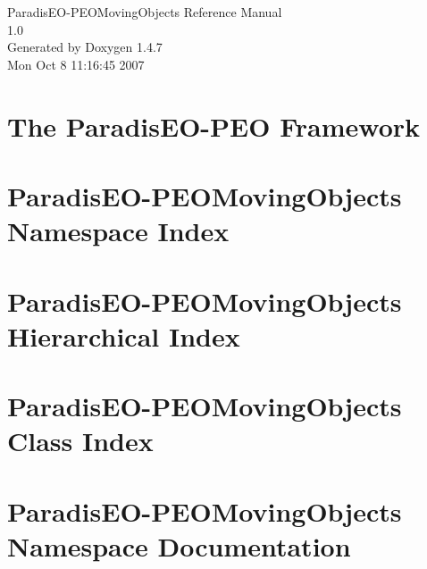 \documentclass[a4paper]{book}
\begin{document}
\begin{titlepage}
\vspace*{7cm}
\begin{center}
{\Large Paradis\-EO-PEOMoving\-Objects Reference Manual\\[1ex]\large 1.0 }\\
\vspace*{1cm}
{\large Generated by Doxygen 1.4.7}\\
\vspace*{0.5cm}
{\small Mon Oct 8 11:16:45 2007}\\
\end{center}
\end{titlepage}
\clearemptydoublepage
{}
\tableofcontents
\clearemptydoublepage
{}
\chapter{The Paradis\-EO-PEO Framework }
\label{index}\hypertarget{index}{}
\chapter{Paradis\-EO-PEOMoving\-Objects Namespace Index}

\chapter{Paradis\-EO-PEOMoving\-Objects Hierarchical Index}

\chapter{Paradis\-EO-PEOMoving\-Objects Class Index}

\chapter{Paradis\-EO-PEOMoving\-Objects Namespace Documentation}

\end{document}
